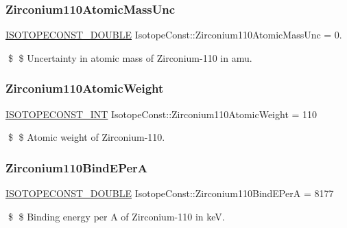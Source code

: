 \subsubsection{\texorpdfstring{Zirconium110\+Atomic\+Mass\+Unc}{Zirconium110AtomicMassUnc}}
{\footnotesize\ttfamily \mbox{\hyperlink{group___isotope_const-_macros_ga8f45a7272ce02c0b4c65c44636ed719a}{I\+S\+O\+T\+O\+P\+E\+C\+O\+N\+S\+T\+\_\+\+D\+O\+U\+B\+LE}} Isotope\+Const\+::\+Zirconium110\+Atomic\+Mass\+Unc = 0.}

\$ \$ Uncertainty in atomic mass of Zirconium-\/110 in amu. \mbox{\label{group___isotope_const-_zirconium-_zr110_ga6aedf8acffe9fc68c2e1503031550a94}} 
\subsubsection{\texorpdfstring{Zirconium110\+Atomic\+Weight}{Zirconium110AtomicWeight}}
{\footnotesize\ttfamily \mbox{\hyperlink{group___isotope_const-_macros_ga5f18360b3e99483a35c32d789e62621c}{I\+S\+O\+T\+O\+P\+E\+C\+O\+N\+S\+T\+\_\+\+I\+NT}} Isotope\+Const\+::\+Zirconium110\+Atomic\+Weight = 110}

\$ \$ Atomic weight of Zirconium-\/110. \mbox{\label{group___isotope_const-_zirconium-_zr110_ga647bffeaed031db51d7d083302433537}} 
\subsubsection{\texorpdfstring{Zirconium110\+Bind\+E\+PerA}{Zirconium110BindEPerA}}
{\footnotesize\ttfamily \mbox{\hyperlink{group___isotope_const-_macros_ga8f45a7272ce02c0b4c65c44636ed719a}{I\+S\+O\+T\+O\+P\+E\+C\+O\+N\+S\+T\+\_\+\+D\+O\+U\+B\+LE}} Isotope\+Const\+::\+Zirconium110\+Bind\+E\+PerA = 8177}

\$ \$ Binding energy per A of Zirconium-\/110 in keV. \mbox{\label{group___isotope_const-_zirconium-_zr110_ga524788facfecdfb024d87bff944b5a62}} 
